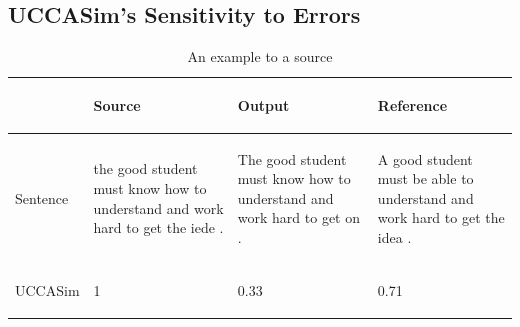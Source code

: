 \documentclass[letterpaper, 11pt]{article}
\begin{document}
\subsection{UCCASim's Sensitivity to Errors}

\begin{table}[]
	\centering	
	\begin{tabular}{p{}|p{}|p{}|p{}}
	  &  \begin{center}
	       Source
	     \end{center}                                                                       & \begin{center}
	    Output
          \end{center}                                                              & \begin{center}
	    Reference
	  \end{center}                                                                 \\\hline
	  \begin{center}
	    Sentence
	  \end{center} & \begin{center}
	    the good student must know how to understand and work hard to get the iede .
	  \end{center} & \begin{center}
	The good student must know how to understand and work hard to get on .
\end{center} & \begin{center}
A good student must be able to understand and work hard to get the idea .
\end{center} \\\hline
		\begin{center}
			UCCASim
		\end{center}    &  \begin{center}
			1
		\end{center}                                                                            & \begin{center}
		0.33
	\end{center}                                                                   & \begin{center}
	0.71
\end{center}                                                                     
	\end{tabular}
	\caption{An example to a source\label{ex:sensitive}}
\end{table}
\end{document}
